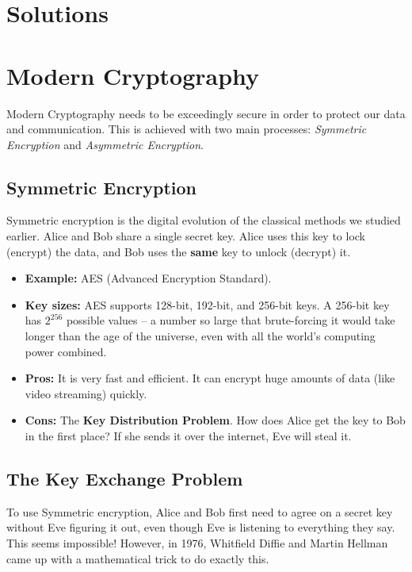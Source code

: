 \documentclass[11pt,a4paper]{report}
\begin{document}
\newpage
\section{Solutions}

\printcursols

\newpage

\section{Modern Cryptography}

Modern Cryptography needs to be exceedingly secure in order to protect our data and communication.
This is achieved with two main processes: \emph{Symmetric Encryption} and \emph{Asymmetric Encryption}.

\subsection{Symmetric Encryption}
Symmetric encryption is the digital evolution of the classical methods we studied earlier.
Alice and Bob share a single secret key. Alice uses this key to lock (encrypt) the data, and Bob uses the \textbf{same} key to unlock (decrypt) it.

\begin{itemize}
    \item \textbf{Example:} AES (Advanced Encryption Standard).
    \item \textbf{Key sizes:} AES supports 128-bit, 192-bit, and 256-bit keys. A 256-bit key has $2^{256}$ possible values -- a number so large that brute-forcing it would take longer than the age of the universe, even with all the world's computing power combined.
    \item \textbf{Pros:} It is very fast and efficient. It can encrypt huge amounts of data (like video streaming) quickly.
    \item \textbf{Cons:} The \textbf{Key Distribution Problem}. How does Alice get the key to Bob in the first place? If she sends it over the internet, Eve will steal it.
\end{itemize}

\subsection{The Key Exchange Problem}
To use Symmetric encryption, Alice and Bob first need to agree on a secret key without Eve figuring it out, even though Eve is listening to everything they say. This seems impossible!
However, in 1976, Whitfield Diffie and Martin Hellman came up with a mathematical trick to do exactly this.
\end{document}
